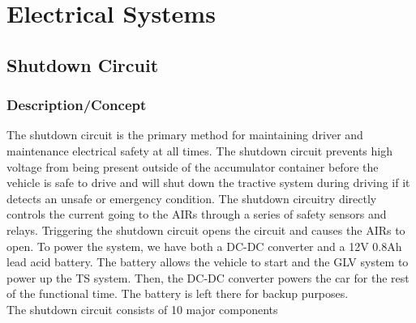 \documentclass{article}
\begin{document}
\newpage

\section{Electrical Systems}

    \subsection{Shutdown Circuit}

        \subsubsection{Description/Concept}

            The shutdown circuit is the primary method for maintaining driver and maintenance electrical safety at all times. The shutdown circuit prevents high voltage from being present outside of the accumulator container before the vehicle is safe to drive and will shut down the tractive system during driving if it detects an unsafe or emergency condition. The shutdown circuitry directly controls the current going to the AIRs through a series of safety sensors and relays. Triggering the shutdown circuit opens the circuit and causes the AIRs to open. To power the system, we have both a DC-DC converter and a 12V 0.8Ah lead acid battery. The battery allows the vehicle to start and the GLV system to power up the TS system. Then, the DC-DC converter powers the car for the rest of the functional time. The battery is left there for backup purposes. \\

            The shutdown circuit consists of 10 major components
\end{document}
